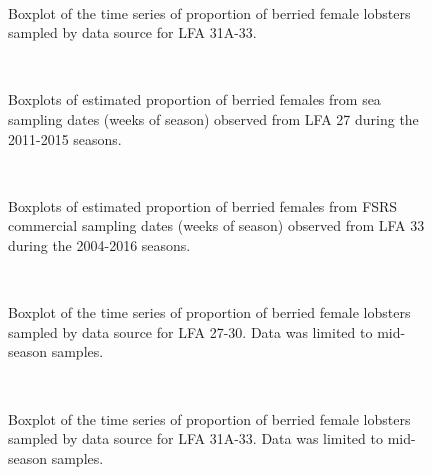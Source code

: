 \documentclass[11pt]{article}
\newcommand{\e}{/backup/bio_data/bio.lobster/figures/} %
\begin{document}
\begin{figure}
        \centering
         \\
                    \caption{Boxplot of the time series of proportion of berried female lobsters sampled by data source for LFA 31A-33. }
        \end{figure}

\begin{figure}
        \centering
         \\
                     \caption{Boxplots of estimated proportion of berried females from sea sampling dates (weeks of season) observed from LFA 27 during the 2011-2015 seasons. }
        \end{figure}
\begin{figure}
        \centering
         \\
                    \caption{Boxplots of estimated proportion of berried females from FSRS commercial sampling dates (weeks of season) observed from LFA 33 during the 2004-2016 seasons. }
        \end{figure}

\begin{figure}
        \centering
         \\
                     \caption{Boxplot of the time series of proportion of berried female lobsters sampled by data source for LFA 27-30. Data was limited to mid-season samples.}
        \end{figure}

\begin{figure}
        \centering
         \\
                    \caption{Boxplot of the time series of proportion of berried female lobsters sampled by data source for LFA 31A-33. Data was limited to mid-season samples.}
        \end{figure}
\end{document}
